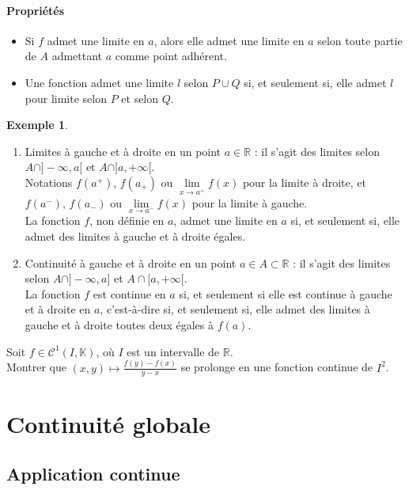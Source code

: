 \documentclass[french]{article}
\newcommand{\R}{\mathbb{R}}
\newcommand{\K}{\mathbb{K}}
\theoremstyle{plain}
\theoremstyle{definition}
\newtheorem*{ex}{Exemple}
\theoremstyle{remark}
\begin{document}
\paragraph{Propriétés}
\begin{itemize}
	\item Si $f$ admet une limite en $a$, alors elle admet une limite en $a$ selon toute partie de $A$ admettant $a$ comme point adhérent.
	\item Une fonction admet une limite $l$ selon $P\cup Q$ si, et seulement si, elle admet $l$ pour limite selon $P$ et selon $Q$.
\end{itemize}

\begin{ex}
	\begin{enumerate}
		\item Limites à gauche et à droite en un point $a\in\R$ : il s'agit des limites selon $A\cap]-\infty,a[$ et $A\cap]a,+\infty[$.\\
		Notations $f(a^+)$, $f(a_+)$ ou $\underset{x\to a^+}{\lim}f(x)$ pour la limite à droite, et $f(a^-)$, $f(a_-)$ ou $\underset{x\to a^-}{\lim}f(x)$ pour la limite à gauche. \\
		La fonction $f$, non définie en $a$, admet une limite en $a$ si, et seulement si, elle admet des limites à gauche et à droite égales.
		\item Continuité à gauche et à droite en un point $a\in A\subset\R$ : il s'agit des limites selon $A\cap]-\infty,a]$ et $A\cap[a,+\infty[$.\\
		La fonction $f$ est continue en $a$ si, et seulement si elle est continue à gauche et à droite en $a$, c'est-à-dire si, et seulement si, elle admet des limites à gauche et à droite toutes deux égales à $f(a)$.
	\end{enumerate}
\end{ex}

\begin{exo}
	Soit $f\in\mathcal{C}^1(I,\K)$, où $I$ est un intervalle de $\R$. \\
	Montrer que $(x,y)\mapsto\displaystyle\frac{f(y)-f(x)}{y-x}$ se prolonge en une fonction continue de $I^2$.
\end{exo}

\section{Continuité globale}

\subsection{Application continue}
\end{document}
